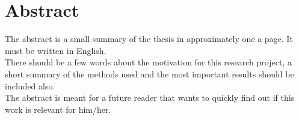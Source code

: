 \chapter*{Abstract}
The abstract is a small summary of the thesis in approximately one a page. It must be written in English.\\
There should be a few words about the motivation for this research project, a short summary of the methods used and the most important results should be included also.\\
The abstract is meant for a future reader that wants to quickly find out if this work is relevant for him/her.

